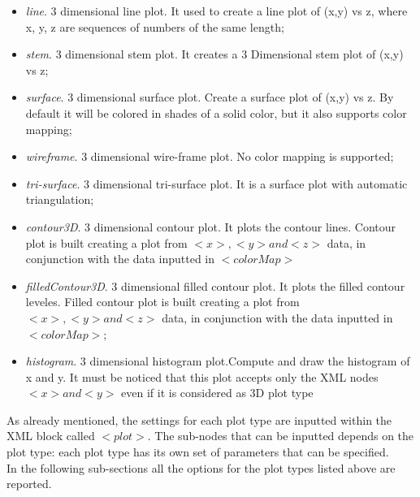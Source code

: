 \begin{itemize}
\begin{itemize}
        \item \textit{line}. 3 dimensional line plot.  It used to create a line plot of (x,y) vs z, where x, y, z are sequences of numbers of the same length; 
        \item \textit{stem}. 3 dimensional stem plot. It creates a 3 Dimensional stem plot of (x,y) vs z;
        \item \textit{surface}. 3 dimensional surface plot. Create a surface plot of (x,y) vs z. By default it will be colored in shades of a solid color, but it also supports color mapping;
        \item \textit{wireframe}. 3 dimensional wire-frame plot. No color mapping  is supported;
        \item \textit{tri-surface}. 3 dimensional tri-surface plot. It is a surface plot with automatic triangulation;
        \item \textit{contour3D}. 3 dimensional contour  plot. It plots the contour lines. Contour plot is built creating a plot from $<x>, <y> and <z>$ data, in conjunction with the data inputted in $<colorMap>$
        \item \textit{filledContour3D}. 3 dimensional filled contour plot. It plots the filled contour leveles. Filled contour plot is built creating a plot from $<x>, <y> and <z>$ data, in conjunction with the data inputted in $<colorMap>$;
        \item \textit{histogram}. 3 dimensional histogram plot.Compute and draw the histogram of x and y. It must be noticed that this plot accepts only the XML nodes $<x> and <y>$ even if it is considered as 3D plot type
       \end{itemize}
\end{itemize}
As already mentioned, the settings for each plot type are inputted within the XML block called $<plot>$. The sub-nodes that can be inputted depends on the plot type: each plot type has its own set of parameters that can be specified.
\\In the following sub-sections all the options for the plot types listed above are reported.

